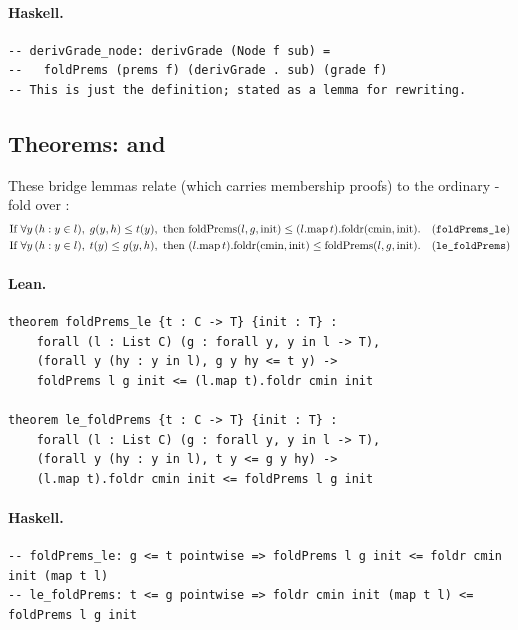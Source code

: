\documentclass[11pt,a4paper]{article}
\begin{document}
\paragraph{Haskell.}
\begin{lstlisting}[style=haskell]
-- derivGrade_node: derivGrade (Node f sub) =
--   foldPrems (prems f) (derivGrade . sub) (grade f)
-- This is just the definition; stated as a lemma for rewriting.
\end{lstlisting}


\subsection{Theorems:  and }

\begin{thm}
These bridge lemmas relate  (which carries membership proofs)
to the ordinary -fold over :
\begin{align*}
  &\text{If }\forall y\,(h : y \in l),\; g(y,h) \le t(y),\text{ then }
  \mathrm{foldPrems}(l, g, \mathrm{init}) \le (l.\mathrm{map}\,t).\mathrm{foldr}(\mathrm{cmin}, \mathrm{init}).
  && \text{(\texttt{foldPrems\_le})}\\
  &\text{If }\forall y\,(h : y \in l),\; t(y) \le g(y,h),\text{ then }
  (l.\mathrm{map}\,t).\mathrm{foldr}(\mathrm{cmin}, \mathrm{init}) \le \mathrm{foldPrems}(l, g, \mathrm{init}).
  && \text{(\texttt{le\_foldPrems})}
\end{align*}
\end{thm}

\paragraph{Lean.}
\begin{lstlisting}[style=lean]
theorem foldPrems_le {t : C -> T} {init : T} :
    forall (l : List C) (g : forall y, y in l -> T),
    (forall y (hy : y in l), g y hy <= t y) ->
    foldPrems l g init <= (l.map t).foldr cmin init

theorem le_foldPrems {t : C -> T} {init : T} :
    forall (l : List C) (g : forall y, y in l -> T),
    (forall y (hy : y in l), t y <= g y hy) ->
    (l.map t).foldr cmin init <= foldPrems l g init
\end{lstlisting}

\paragraph{Haskell.}
\begin{lstlisting}[style=haskell]
-- foldPrems_le: g <= t pointwise => foldPrems l g init <= foldr cmin init (map t l)
-- le_foldPrems: t <= g pointwise => foldr cmin init (map t l) <= foldPrems l g init
\end{lstlisting}
\end{document}
